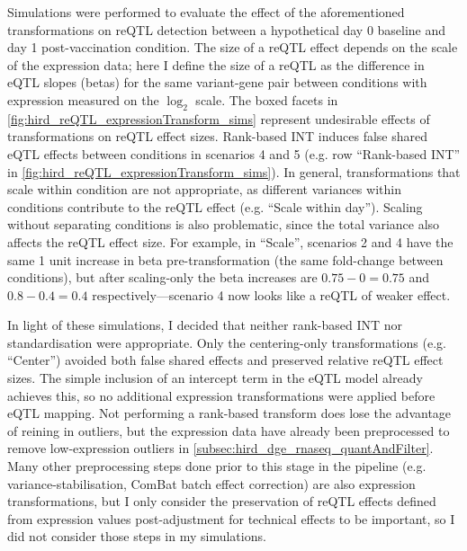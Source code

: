 Simulations were performed to evaluate the effect of the aforementioned transformations on \gls{reQTL} detection between a hypothetical day 0 baseline and day 1 post-vaccination condition.
The size of a \gls{reQTL} effect depends on the scale of the expression data;
here I define the size of a \gls{reQTL} as the difference in \gls{eQTL} slopes (betas) for the same variant-gene pair between conditions with expression measured on the $\log_2$ scale.
The boxed facets in \cref{fig:hird_reQTL_expressionTransform_sims} represent undesirable effects of transformations on \gls{reQTL} effect sizes.
Rank-based \gls{INT} induces false shared \gls{eQTL} effects between conditions in scenarios 4 and 5 (e.g. row \enquote{Rank-based INT} in \cref{fig:hird_reQTL_expressionTransform_sims}).
In general, transformations that scale within condition are not appropriate, as different variances within conditions contribute to the \gls{reQTL} effect (e.g. \enquote{Scale within day}).
Scaling without separating conditions is also problematic, since the total variance also affects the \gls{reQTL} effect size.
For example, in \enquote{Scale}, scenarios 2 and 4 have the same 1 unit increase in beta pre-transformation (the same fold-change between conditions), 
but after scaling-only the beta increases are $0.75-0=0.75$ and $0.8-0.4=0.4$ respectively---scenario 4 now looks like a \gls{reQTL} of weaker effect.

In light of these simulations, I decided that neither rank-based \gls{INT} nor standardisation were appropriate.
Only the centering-only transformations (e.g. \enquote{Center}) avoided both false shared effects and preserved relative \gls{reQTL} effect sizes.
The simple inclusion of an intercept term in the \gls{eQTL} model already achieves this, so no additional expression transformations were applied before \gls{eQTL} mapping.
Not performing a rank-based transform does lose the advantage of reining in outliers,
but the expression data have already been preprocessed to remove low-expression outliers in \cref{subsec:hird_dge_rnaseq_quantAndFilter}.
Many other preprocessing steps done prior to this stage in the pipeline (e.g. variance-stabilisation, ComBat batch effect correction) are also expression transformations,
but I only consider the preservation of \gls{reQTL} effects defined from expression values post-adjustment for technical effects to be important,
so I did not consider those steps in my simulations.

